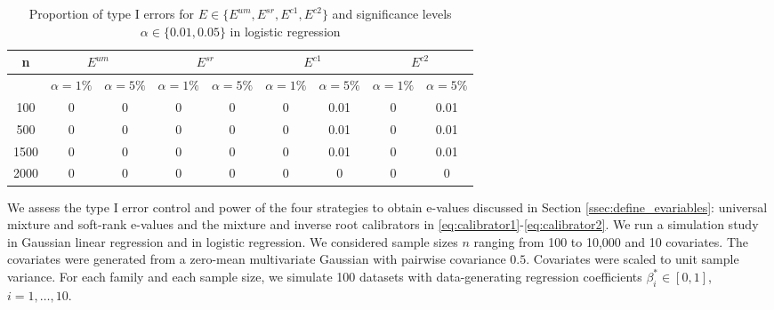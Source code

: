 \documentclass[pdflatex,sn-mathphys-num]{sn-jnl}%
\theoremstyle{thmstyleone}%
\theoremstyle{thmstyletwo}%
\theoremstyle{thmstylethree}%
\begin{document}
\begin{table}[ht]
\caption{Proportion of type I errors for $E\in\{E^{um},E^{sr},E^{c1},E^{c2}\}$ and significance levels $\alpha \in \{0.01,0.05\}$ in logistic regression}\label{tabtype1logreg}%
\begin{tabular}{ccc|cc|cc|cc}
\hline
n    & \multicolumn{2}{c|}{$E^{um}$} & \multicolumn{2}{c|}{$E^{sr}$}& \multicolumn{2}{c|}{$E^{c1}$} & \multicolumn{2}{c}{$E^{c2}$}\\ \hline
     & $\alpha=1\%$ & $\alpha=5\%$ & $\alpha=1\%$ & $\alpha=5\%$ & $\alpha=1\%$ & $\alpha=5\%$ & $\alpha=1\%$ & $\alpha=5\%$ \\
100  & 0                          & 0                          & 0                          & 0                          & 0                       & 0.01                       & 0                      & 0.01                      \\
500  & 0                          & 0                          & 0                          & 0                          & 0                          & 0.01                          & 0                          & 0.01                          \\
1500 & 0                          & 0                          & 0                          & 0                          & 0                          & 0.01                          & 0                          & 0.01                          \\
2000 & 0                          & 0                          & 0                          & 0                          & 0                          & 0                          & 0                          & 0                          \\ \hline
\end{tabular}
\end{table}


We assess the type I error control and power of the four strategies to obtain e-values discussed in Section \ref{ssec:define_evariables}: universal mixture and soft-rank e-values and the mixture and inverse root calibrators in \eqref{eq:calibrator1}-\eqref{eq:calibrator2}. We run a simulation study in Gaussian linear regression and in logistic regression. We considered sample sizes $n$ ranging from 100 to 10,000 and 10 covariates. The covariates were generated from a zero-mean multivariate Gaussian with pairwise covariance $0.5$. Covariates were scaled to unit sample variance. For each family and each sample size, we simulate 100 datasets with data-generating regression coefficients $\beta_i^*\in[0,1]$, $i=1,\ldots,10$.
\end{document}
